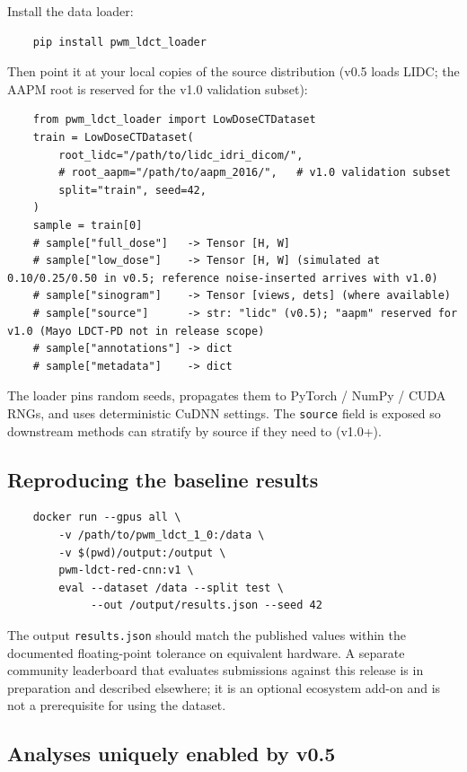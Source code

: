\documentclass[twoside,11pt]{article}
\begin{document}
Install the data loader:
\begin{verbatim}
    pip install pwm_ldct_loader
\end{verbatim}

Then point it at your local copies of the source distribution (v0.5 loads LIDC; the AAPM root is reserved for the v1.0 validation subset):
\begin{verbatim}
    from pwm_ldct_loader import LowDoseCTDataset
    train = LowDoseCTDataset(
        root_lidc="/path/to/lidc_idri_dicom/",
        # root_aapm="/path/to/aapm_2016/",   # v1.0 validation subset
        split="train", seed=42,
    )
    sample = train[0]
    # sample["full_dose"]   -> Tensor [H, W]
    # sample["low_dose"]    -> Tensor [H, W] (simulated at 0.10/0.25/0.50 in v0.5; reference noise-inserted arrives with v1.0)
    # sample["sinogram"]    -> Tensor [views, dets] (where available)
    # sample["source"]      -> str: "lidc" (v0.5); "aapm" reserved for v1.0 (Mayo LDCT-PD not in release scope)
    # sample["annotations"] -> dict
    # sample["metadata"]    -> dict
\end{verbatim}

The loader pins random seeds, propagates them to PyTorch / NumPy / CUDA RNGs, and uses deterministic CuDNN settings. The \texttt{source} field is exposed so downstream methods can stratify by source if they need to (v1.0+).

\subsection*{Reproducing the baseline results}

\begin{verbatim}
    docker run --gpus all \
        -v /path/to/pwm_ldct_1_0:/data \
        -v $(pwd)/output:/output \
        pwm-ldct-red-cnn:v1 \
        eval --dataset /data --split test \
             --out /output/results.json --seed 42
\end{verbatim}

The output \texttt{results.json} should match the published values within the documented floating-point tolerance on equivalent hardware. A separate community leaderboard that evaluates submissions against this release is in preparation and described elsewhere; it is an optional ecosystem add-on and is not a prerequisite for using the dataset.

\subsection*{Analyses uniquely enabled by v0.5}
\end{document}
